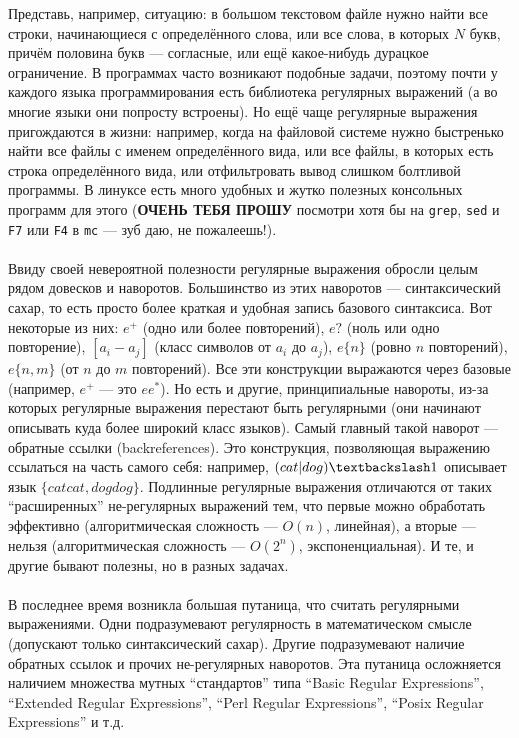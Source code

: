 \documentclass[11pt]{book}
\begin{document}
Представь, например, ситуацию: в большом текстовом файле нужно найти все строки, начинающиеся с определённого слова,
или все слова, в которых $N$ букв, причём половина букв --- согласные, или ещё какое-нибудь дурацкое ограничение.
В программах часто возникают подобные задачи, поэтому почти у каждого языка программирования есть библиотека регулярных выражений
(а во многие языки они попросту встроены).
Но ещё чаще регулярные выражения пригождаются в жизни: например, когда на файловой системе нужно быстренько найти все файлы с именем определённого вида,
или все файлы, в которых есть строка определённого вида, или отфильтровать вывод слишком болтливой программы.
В линуксе есть много удобных и жутко полезных консольных программ для этого
(\textbf{ОЧЕНЬ ТЕБЯ ПРОШУ} посмотри хотя бы на \texttt{grep}, \texttt{sed} и \texttt{F7} или \texttt{F4} в \texttt{mc} --- зуб даю, не пожалеешь!).
\\ \\
Ввиду своей невероятной полезности регулярные выражения обросли целым рядом довесков и наворотов.
Большинство из этих наворотов --- синтаксический сахар, то есть просто более краткая и удобная запись базового синтаксиса.
Вот некоторые из них:
$e^+$ (одно или более повторений),
$e?$ (ноль или одно повторение),
$[a_i-a_j]$ (класс символов от $a_i$ до $a_j$),
$e\{n\}$ (ровно $n$ повторений),
$e\{n,m\}$ (от $n$ до $m$ повторений).
Все эти конструкции выражаются через базовые (например, $e^+$ --- это $ee^*$).
Но есть и другие, принципиальные навороты, из-за которых регулярные выражения перестают быть регулярными
(они начинают описывать куда более широкий класс языков).
Самый главный такой наворот --- обратные ссылки (backreferences).
Это конструкция, позволяющая выражению ссылаться на часть самого себя:
например, $(cat|dog)\textbackslash1$ описывает язык $\{catcat,dogdog\}$.
Подлинные регулярные выражения отличаются от таких ``расширенных'' не-регулярных выражений тем,
что первые можно обработать эффективно (алгоритмическая сложность --- $O(n)$, линейная),
а вторые --- нельзя (алгоритмическая сложность --- $O(2^n)$, экспоненциальная).
И те, и другие бывают полезны, но в разных задачах.
\\ \\
В последнее время возникла большая путаница, что считать регулярными выражениями.
Одни подразумевают регулярность в математическом смысле (допускают только синтаксический сахар).
Другие подразумевают наличие обратных ссылок и прочих не-регулярных наворотов.
Эта путаница осложняется наличием множества мутных ``стандартов'' типа
``Basic Regular Expressions'', ``Extended Regular Expressions'', ``Perl Regular Expressions'', ``Posix Regular Expressions'' и т.д.
\end{document}
